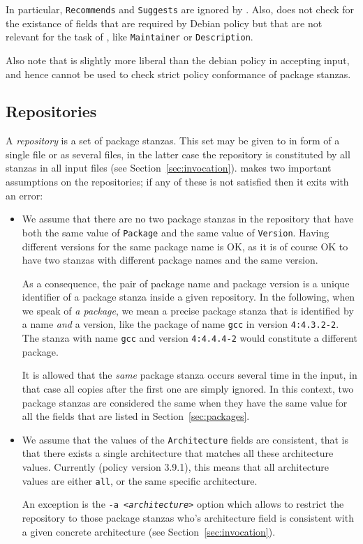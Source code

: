 In particular, \texttt{Recommends} and \texttt{Suggests} are ignored
by \debcheck. Also, \debcheck{} does not check for the existance of
fields that are required by Debian policy but that are not relevant
for the task of \debcheck, like \texttt{Maintainer} or
\texttt{Description}.

Also note that \debcheck{} is slightly more liberal than the debian
policy in accepting input, and hence cannot be used to check strict
policy conformance of package stanzas.

\subsection{Repositories}
\label{sec:repositories}
A \emph{repository} is a set of package stanzas. This set may be given
to \debcheck{} in form of a single file or as several files, in the
latter case the repository is constituted by all stanzas in all input
files (see Section~\ref{sec:invocation}). \debcheck{} makes two
important assumptions on the repositories; if any of these is not
satisfied then it exits with an error:

\begin{itemize}
\item
  We assume that there are no two package stanzas in the repository
  that have both the same value of \texttt{Package} and the same value
  of \texttt{Version}. Having different versions for the same package
  name is OK, as it is of course OK to have two stanzas with different
  package names and the same version.

  As a consequence, the pair of package name and package version is a
  unique identifier of a package stanza inside a given repository. In
  the following, when we speak of \emph{a package}, we mean a precise
  package stanza that is identified by a name \emph{and} a version,
  like the package of name \texttt{gcc} in version \texttt{4:4.3.2-2}.
  The stanza with name \texttt{gcc} and version \texttt{4:4.4.4-2}
  would constitute a different package.

  It is allowed that the \emph{same} package stanza occurs several
  time in the input, in that case all copies after the first one are
  simply ignored. In this context, two package stanzas are considered
  the same when they have the same value for all the fields that are
  listed in Section~\ref{sec:packages}.
\item
  We assume that the values of the \texttt{Architecture} fields are
  consistent, that is that there exists a single architecture that
  matches all these architecture values. Currently (policy version
  3.9.1), this means that all architecture values are either
  \texttt{all}, or the same specific architecture.

  An exception is the \texttt{-a \textit{<architecture>}} option which
  allows to restrict the repository to those package stanzas who's
  architecture field is consistent with a given concrete architecture
  (see Section~\ref{sec:invocation}).
\end{itemize}

